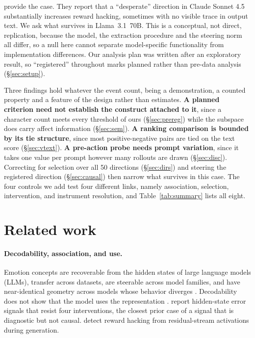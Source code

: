 \documentclass{article}
\begin{document}
\citet{sofroniew2026} provide the case. They report that a ``desperate''
direction in Claude Sonnet 4.5 substantially increases reward hacking, sometimes
with no visible trace in output text. We ask what survives in Llama~3.1~70B. This is a conceptual, not
direct, replication, because the model, the extraction procedure and the steering
norm all differ, so a null here cannot separate model-specific functionality from
implementation differences. Our analysis plan was written after an exploratory
result, so ``registered'' throughout marks planned rather than pre-data analysis
(\S\ref{sec:setup}).

Three findings hold whatever the event count, being a demonstration, a counted
property and a feature of the design rather than estimates. \textbf{A planned criterion need not establish the construct attached to it}, since a
character count meets every threshold of ours (\S\ref{sec:prereg}) while the
subspace does carry affect information (\S\ref{sec:sem}). \textbf{A ranking comparison is bounded by its tie structure}, since most
positive-negative pairs are tied on the text score (\S\ref{sec:vtext}).
\textbf{A pre-action probe needs prompt variation}, since it takes one value per
prompt however many rollouts are drawn (\S\ref{sec:disc}). Correcting for selection over all 50 directions
(\S\ref{sec:dirs}) and steering the registered direction (\S\ref{sec:causal})
then narrow what survives in this case. The four controls we add test four
different links, namely association, selection, intervention, and instrument
resolution, and Table~\ref{tab:summary} lists all eight.

\section{Related work}

\paragraph{Decodability, association, and use.} Emotion concepts are recoverable
from the hidden states of large language models (LLMs), transfer across datasets,
are steerable across model families, and have near-identical geometry across models
whose behavior diverges \citep{maheswaran2026unified, banayeeanzade2026psyset,
jeong2026geometry}. Decodability does not show that the model uses the
representation \citep{hewitt2019control, elazar2021amnesic}. \citet{yuan2026hidden} report hidden-state error signals that resist four
interventions, the closest prior case of a signal that is diagnostic but not
causal. \citet{wilhelm2026monitoring} detect reward hacking from residual-stream
activations during generation.
\end{document}
